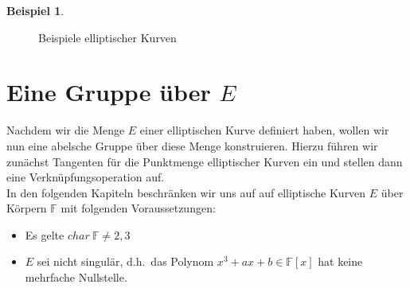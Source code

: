 \documentclass[hidelinks]{article}
\theoremstyle{plain}
\theoremstyle{definition}
\newtheorem{bsp}[thm]{Beispiel}
\theoremstyle{rem}
\begin{document}
\begin{sloppypar}
\begin{bsp}
\begin{figure}[H]
{}
        \qquad
        \caption{Beispiele elliptischer Kurven}
	\label{fig:elliptic-curves}
    \end{figure}
\end{bsp}


\section{Eine Gruppe über $E$}
Nachdem wir die Menge $E$ einer elliptischen Kurve definiert haben, wollen wir nun eine abelsche Gruppe über diese Menge konstruieren. Hierzu führen wir zunächst Tangenten für die Punktmenge elliptischer Kurven ein und stellen dann eine Verknüpfungsoperation auf.\\

In den folgenden Kapiteln beschränken wir uns auf auf elliptische Kurven $E$ über Körpern $\mathbb{F}$ mit folgenden Voraussetzungen:
\begin{itemize}
	\item Es gelte $char\ \mathbb{F}\ne2,3$
	\item $E$ sei nicht singulär, d.h.\ das Polynom $x^3+ax+b\in\mathbb{F}[x]$ hat keine mehrfache Nullstelle.
\end{itemize}


\end{sloppypar}
\end{document}
